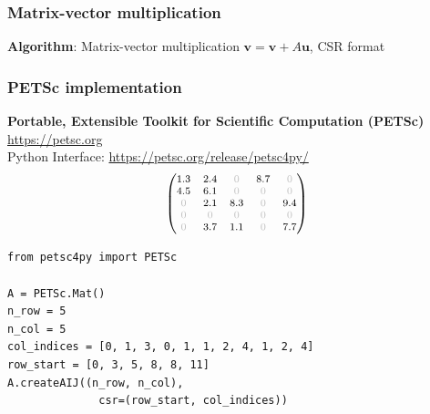\documentclass{beamer}
\begin{document}

\begin{frame}[fragile]
  \frametitle{Matrix-vector multiplication}
\textbf{Algorithm}: Matrix-vector multiplication $\boldsymbol{v} = \boldsymbol{v} + A\boldsymbol{u}$, CSR format
\begin{algorithmic}[1]
    \EndFor
  \EndFor
\end{algorithmic}
\end{frame}


\begin{frame}[fragile]
  \frametitle{PETSc implementation}
  \textbf{Portable, Extensible Toolkit for Scientific Computation (PETSc)} \url{https://petsc.org}\\[1ex]
  Python Interface: \url{https://petsc.org/release/petsc4py/}
  $$
{\footnotesize
  \begin{pmatrix}
1.3 & 2.4 & \textcolor{lightgray}{0} & 8.7 & \textcolor{lightgray}{0} \\
4.5 & 6.1 & \textcolor{lightgray}{0} & \textcolor{lightgray}{0} & \textcolor{lightgray}{0} \\
\textcolor{lightgray}{0} & 2.1 & 8.3 & \textcolor{lightgray}{0} & 9.4 \\
\textcolor{lightgray}{0} & \textcolor{lightgray}{0} & \textcolor{lightgray}{0} & \textcolor{lightgray}{0} & \textcolor{lightgray}{0} \\
\textcolor{lightgray}{0} & 3.7 & 1.1 & \textcolor{lightgray}{0} & 7.7
\end{pmatrix}}
$$
\begin{lstlisting}
from petsc4py import PETSc  

A = PETSc.Mat()  
n_row = 5
n_col = 5
col_indices = [0, 1, 3, 0, 1, 1, 2, 4, 1, 2, 4]
row_start = [0, 3, 5, 8, 8, 11]
A.createAIJ((n_row, n_col),
              csr=(row_start, col_indices))
\end{lstlisting}
\end{frame}

\end{document}
